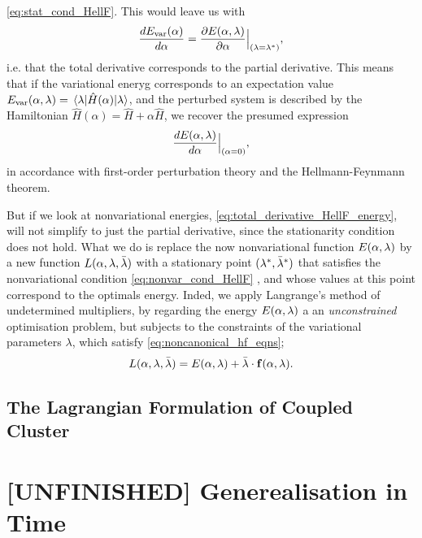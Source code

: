 \autoref{eq:stat_cond_HellF}. This would leave us with 
\begin{equation}
    \frac{d E_{\text{var}}(\alpha)}{d\alpha} 
    = \frac{\partial E(\alpha, \vb{\lambda})}{\partial\alpha}\Big\lvert_{(\vb{\lambda} = \vb{\lambda}^*)},
\end{equation}
i.e. that the total derivative corresponds to the partial derivative. This means that if the variational 
eneryg corresponds to an expectation value 
$E_{\text{var}}(\alpha, \vb{\lambda}) = \mel{\vb{\lambda}}{\hat{H}(\alpha)}{\vb{\lambda}}$, and the 
perturbed system is described by the Hamiltonian $\hat{H}(\alpha) = \hat{H} + \alpha\hat{H}$, we 
recover the presumed expression
\begin{equation}
\frac{dE(\alpha, \vb{\lambda})}{d\alpha}\Big\lvert_{(\alpha = 0)},
\end{equation}
in accordance with first-order perturbation theory and the Hellmann-Feynmann theorem.

But if we look at nonvariational energies, \autoref{eq:total_derivative_HellF_energy},
will not simplify to just the partial derivative, since the stationarity condition does not hold. 
What we do is replace the now nonvariational function $E(\alpha, \vb{\lambda})$ by a new function 
$L(\alpha, \vb{\lambda}, \bar{\vb{\lambda}})$ with a stationary point 
$(\vb{\lambda}^*, \bar{\vb{\lambda}}^*)$ that satisfies the nonvariational condition
\autoref{eq:nonvar_cond_HellF}
, and whose values at this point correspond to the optimals 
energy. Inded, we apply Langrange's method of undetermined multipliers, by regarding the 
energy $E(\alpha, \vb{\lambda})$ a an \emph{unconstrained} optimisation problem, but 
subjects to the constraints of the variational parameters $\lambda$, which satisfy
\autoref{eq:noncanonical_hf_eqns};
\begin{equation}
    L(\alpha, \vb{\lambda}, \bar{\vb{\lambda}})
    = E(\alpha, \vb{\lambda}) + \bar{\vb{\lambda}} \cdot \vb{f}(\alpha, \vb{\lambda}).
\end{equation}

\subsection{The Lagrangian Formulation of Coupled Cluster}



\section{[UNFINISHED] Generealisation in Time}